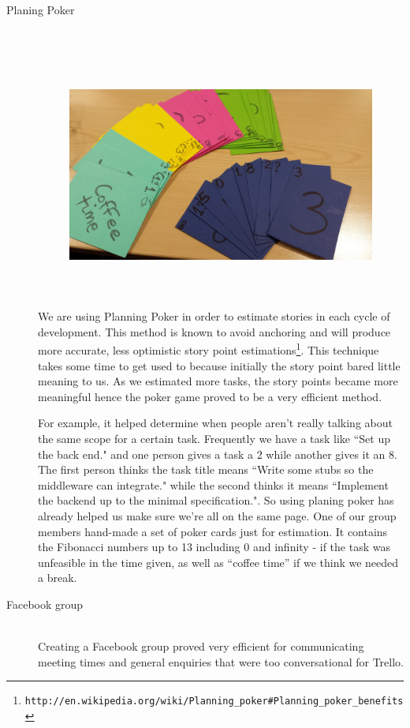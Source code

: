 \documentclass[11pt, a4paper]{article}
\begin{document}
\begin{description}
\item[Planing Poker] \hfill \\
\begin{figure}[h!]
\centering
\includegraphics[height=80mm,width=130mm]{planningPokers.jpg}
\end{figure}

We are using Planning Poker in order to estimate stories in each cycle of development. 
This method is known to avoid anchoring and will produce more accurate, less optimistic story point estimations\footnote{\tt{http://en.wikipedia.org/wiki/Planning\_poker\#Planning\_poker\_benefits}}. This technique takes some time to get used to because initially the story point bared little meaning to us.
As we estimated more tasks, the story points became more meaningful hence the poker game proved to be a very efficient method.

For example, it helped determine when people aren't really talking about the same scope for a certain task.
Frequently we have a task like ``Set up the back end." and one person gives a task a 2 while another gives it an 8.
The first person thinks the task title means ``Write some stubs so the middleware can integrate." while the second thinks it means ``Implement the backend up to the minimal specification.". 
So using planing poker has already helped us make sure we're all on the same page.
One of our group members hand-made a set of poker cards just for estimation.
It contains the Fibonacci numbers up to 13 including 0 and infinity - if the task was unfeasible in the time given, as well as ``coffee time'' if we think we needed a break. 

\item[Facebook group] \hfill \\
Creating a Facebook group proved very efficient for communicating meeting times and general enquiries that were too conversational for Trello.  


\end{description}
\end{document}
